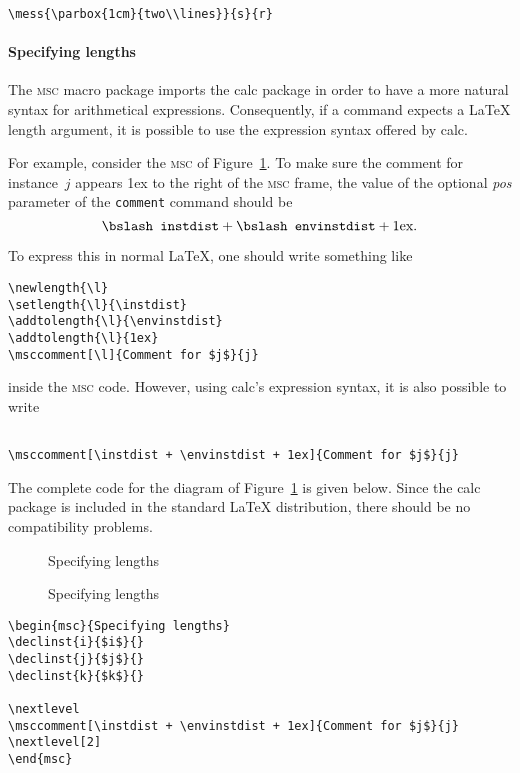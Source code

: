 \documentclass[a4paper]{article}
\newcommand{\cmd}[1]{\texttt{\bslash #1}}
\newcommand{\acro}[1]{{\scshape\lowercase{#1}}}
\newcommand\MSC{\acro{MSC}}
\newcommand{\mscpack}{\MSC{} macro package}
\begin{document}
\verb|\mess{\parbox{1cm}{two\\lines}}{s}{r}|


\paragraph{Specifying lengths}
The \mscpack{} imports the \textsf{calc} package in order to have a
more natural syntax for arithmetical expressions.  Consequently, if a
command expects a \LaTeX{} length argument, it is possible to use the
expression syntax offered by \textsf{calc}.

For example, consider the \MSC{} of
Figure~\ref{fig:specifying:lengths}. To make sure the comment for
instance~$j$ appears 1ex to the right of the \MSC{} frame, the value
of the optional \emph{pos} parameter of the \cmd{comment} command
should be
\[ \cmd{instdist} + \cmd{envinstdist} + 1\textrm{ex}. \]

To express this in normal \LaTeX, one should write something like
\begin{verbatim}
\newlength{\l}
\setlength{\l}{\instdist}
\addtolength{\l}{\envinstdist}
\addtolength{\l}{1ex}
\msccomment[\l]{Comment for $j$}{j}
\end{verbatim}
inside the \MSC{} code. However, using \textsf{calc}'s expression
syntax, it is also possible to write
\begin{verbatim}

\msccomment[\instdist + \envinstdist + 1ex]{Comment for $j$}{j}
\end{verbatim}
The complete code for the diagram of
Figure~\ref{fig:specifying:lengths} is given below.  Since the
\textsf{calc} package is included in the standard \LaTeX{}
distribution, there should be no compatibility problems.
\begin{figure}[htb]
\begin{center}
\begin{msc}{Specifying lengths}

\nextlevel
{}
\nextlevel[2]
\end{msc}

\caption{Specifying lengths}
\label{fig:specifying:lengths}
\end{center}
\end{figure}

{\small
\begin{verbatim}
\begin{msc}{Specifying lengths}
\declinst{i}{$i$}{}
\declinst{j}{$j$}{}
\declinst{k}{$k$}{}

\nextlevel
\msccomment[\instdist + \envinstdist + 1ex]{Comment for $j$}{j}
\nextlevel[2]
\end{msc}
\end{verbatim}
}
\end{document}

